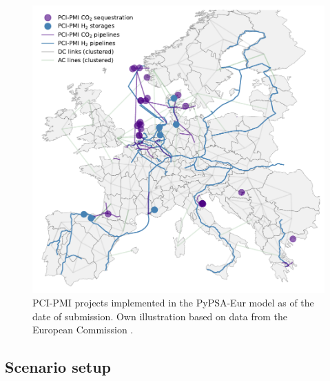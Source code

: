 \documentclass[final,5p,times,twocolumn]{elsarticle}
\let\autocite\cite
\begin{document}
\begin{figure}[t]
  \centering
  \includegraphics[width=\linewidth]{pci_pmi_projects_map}
  \caption{PCI-PMI projects implemented in the PyPSA-Eur model as of the date of submission. Own illustration based on data from the European Commission \autocite{europeancommissionPCIPMITransparencyPlatform2024}.}
  \label{fig:pci_pmi_projects_map}
\end{figure}


\subsection{Scenario setup}
\label{sec:scenario_setup}
\end{document}
